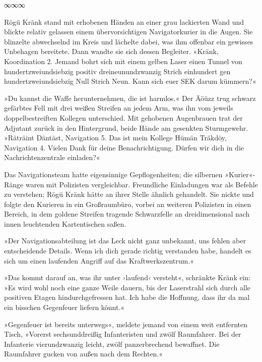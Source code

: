 \begin{center}
	∞∞∞
\end{center}

Rögü Kränk stand mit erhobenen Händen an einer grau lackierten Wand und blickte relativ gelassen einem übervorsichtigen Navigatorkurier in die Augen. Sie blinzelte abwechselnd im Kreis und lächelte dabei, was ihm offenbar ein gewisses Unbehagen bereitete. Dann wandte sie sich dessen Begleiter. »Kränk, Koordination 2. Jemand bohrt sich mit einem gelben Laser einen Tunnel von hundertzweiundsiebzig positiv dreineunundzwanzig Strich einhundert gen hundertzweiundsiebzig Null Strich Neun. Kann sich euer SEK darum kümmern?«

»Du kannst die Waffe herunternehmen, die ist harmlos.« Der Äöüzz trug schwarz gefärbtes Fell mit drei weißen Streifen an jedem Arm, was ihn vom jeweils doppelbestreiften Kollegen unterschied. Mit gehobenen Augenbrauen trat der Adjutant zurück in den Hintergrund, beide Hände am gesenkten Sturmgewehr. »Räträint Däntäst, Navigation 5. Das ist mein Kollege Hümän Träkdöy, Navigation 4. Vielen Dank für deine Benachrichtigung. Dürfen wir dich in die Nachrichtenzentrale einladen?«

Das Navigationsteam hatte eigensinnige Gepflogenheiten; die silbernen »Kurier«-Ränge waren mit Polizisten vergleichbar. Freundliche Einladungen war als Befehle zu verstehen; Rögü Kränk hätte an ihrer Stelle ähnlich gehandelt. Sie nickte und folgte den Kurieren in ein Großraumbüro, vorbei an weiteren Polizisten in einen Bereich, in dem goldene Streifen tragende Schwarzfelle an dreidimensional nach innen leuchtenden Kartentischen saßen.

»Der Navigationsabteilung ist das Leck nicht ganz unbekannt, uns fehlen aber entscheidende Details. Wenn ich dich gerade richtig verstanden habe, handelt es sich um einen laufenden Angriff auf das Kraftwerkszentrum.«

»Das kommt darauf an, was ihr unter ›laufend‹ versteht«, schränkte Kränk ein: »Es wird wohl noch eine ganze Weile dauern, bis der Laserstrahl sich durch alle positiven Etagen hindurchgefressen hat. Ich habe die Hoffnung, dass ihr da mal ein bisschen Gegenfeuer liefern könnt.«

»Gegenfeuer ist bereits unterwegs«, meldete jemand von einem weit entfernten Tisch, »Vorerst sechsunddreißig Infanteristen und zwölf Raumfahrer. Bei der Infanterie vierundzwanzig leicht, zwölf panzerbrechend bewaffnet. Die Raumfahrer gucken von außen nach dem Rechten.«

